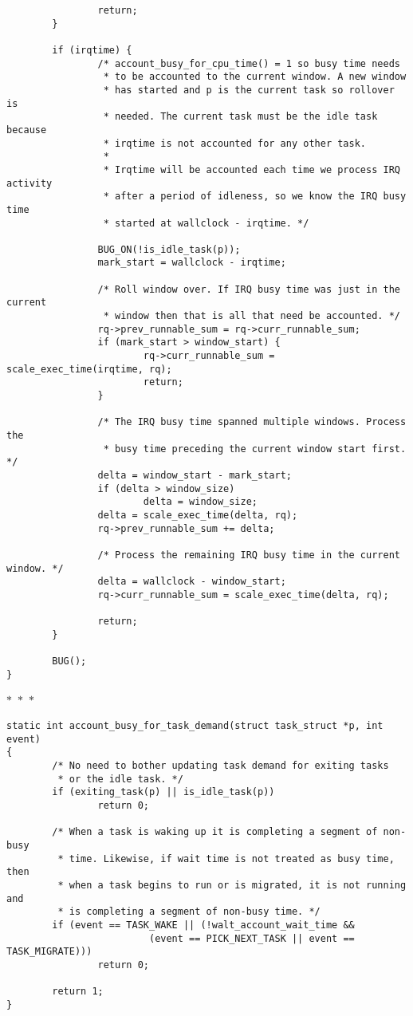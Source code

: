 \documentclass{article}
\newcommand{\divider}{{\begin{center}
  $\ast$~$\ast$~$\ast$
\end{center}}}
\begin{document}
\begin{verbatim}
                return;
        }

        if (irqtime) {
                /* account_busy_for_cpu_time() = 1 so busy time needs
                 * to be accounted to the current window. A new window
                 * has started and p is the current task so rollover is
                 * needed. The current task must be the idle task because
                 * irqtime is not accounted for any other task.
                 *
                 * Irqtime will be accounted each time we process IRQ activity
                 * after a period of idleness, so we know the IRQ busy time
                 * started at wallclock - irqtime. */

                BUG_ON(!is_idle_task(p));
                mark_start = wallclock - irqtime;

                /* Roll window over. If IRQ busy time was just in the current
                 * window then that is all that need be accounted. */
                rq->prev_runnable_sum = rq->curr_runnable_sum;
                if (mark_start > window_start) {
                        rq->curr_runnable_sum = scale_exec_time(irqtime, rq);
                        return;
                }

                /* The IRQ busy time spanned multiple windows. Process the
                 * busy time preceding the current window start first. */
                delta = window_start - mark_start;
                if (delta > window_size)
                        delta = window_size;
                delta = scale_exec_time(delta, rq);
                rq->prev_runnable_sum += delta;

                /* Process the remaining IRQ busy time in the current window. */
                delta = wallclock - window_start;
                rq->curr_runnable_sum = scale_exec_time(delta, rq);

                return;
        }

        BUG();
}
\end{verbatim}
\divider
\begin{verbatim}
static int account_busy_for_task_demand(struct task_struct *p, int event)
{
        /* No need to bother updating task demand for exiting tasks
         * or the idle task. */
        if (exiting_task(p) || is_idle_task(p))
                return 0;

        /* When a task is waking up it is completing a segment of non-busy
         * time. Likewise, if wait time is not treated as busy time, then
         * when a task begins to run or is migrated, it is not running and
         * is completing a segment of non-busy time. */
        if (event == TASK_WAKE || (!walt_account_wait_time &&
                         (event == PICK_NEXT_TASK || event == TASK_MIGRATE)))
                return 0;

        return 1;
}
\end{verbatim}
\end{document}

